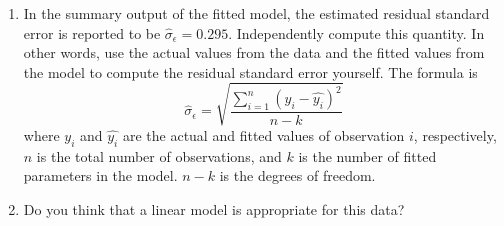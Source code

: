 \begin{enumerate}
\begin{enumerate}
  \item In the summary output of the fitted model, the estimated residual
    standard error is reported to be
    $\hat{\sigma}_{\epsilon}=0.295$. Independently compute this quantity. In
    other words, use the actual values from the data and the fitted
    values from the model to compute the residual standard error
    yourself.  The formula is
    \[ \hat{\sigma}_{\epsilon} = \sqrt{ \frac{\sum_{i=1}^n \left(y_i - \hat{y_i}\right)^2}{n-k}} \]
    where $y_i$ and $\hat{y_i}$ are the actual and fitted values of observation
    $i$, respectively, $n$ is the total number of observations, and $k$ is the
    number of fitted parameters in the model. $n-k$ is the degrees of freedom.

  \item Do you think that a linear model is appropriate for this data?
  \end{enumerate}
    
\end{enumerate}
